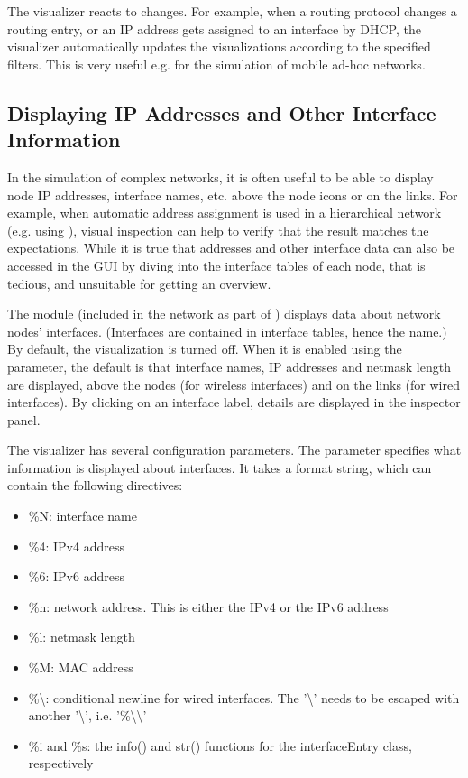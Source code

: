 The visualizer reacts to changes. For example, when a routing protocol changes a
routing entry, or an IP address gets assigned to an interface by DHCP, the
visualizer automatically updates the visualizations according to the specified
filters. This is very useful e.g. for the simulation of mobile ad-hoc networks.

\subsection{Displaying IP Addresses and Other Interface Information}

In the simulation of complex networks, it is often useful to be able to display
node IP addresses, interface names, etc. above the node icons or on the links.
For example, when automatic address assignment is used in a hierarchical network
(e.g. using ), visual inspection can help to
verify that the result matches the expectations. While it is true that addresses and other
interface data can also be accessed in the GUI by diving into the interface
tables of each node, that is tedious, and unsuitable for getting an overview.

The  module (included in the network as part of
) displays data about network nodes' interfaces.
(Interfaces are contained in interface tables, hence the name.) By default, the
visualization is turned off. When it is enabled using the
 parameter, the default is that interface names, IP
addresses and netmask length are displayed, above the nodes (for wireless
interfaces) and on the links (for wired interfaces). By clicking on an interface
label, details are displayed in the inspector panel.

The visualizer has several configuration parameters. The  parameter
specifies what information is displayed about interfaces. It takes a format
string, which can contain the following directives:

\begin{itemize}
  \item \%N: interface name
  \item \%4: IPv4 address
  \item \%6: IPv6 address
  \item \%n: network address. This is either the IPv4 or the IPv6 address
  \item \%l: netmask length
  \item \%M: MAC address
  \item \%\textbackslash: conditional newline for wired interfaces. The '\textbackslash'
  needs to be escaped with another '\textbackslash', i.e. '\%\textbackslash\textbackslash'
  \item \%i and \%s: the info() and str() functions for the interfaceEntry class, respectively
\end{itemize}

